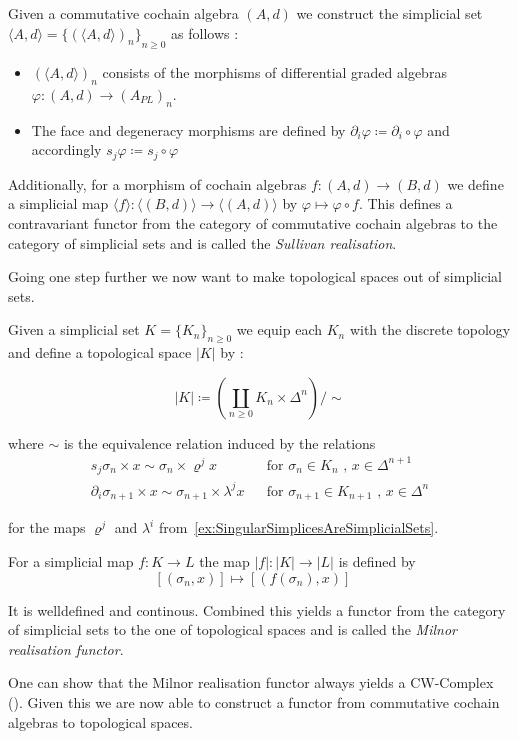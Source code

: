  \begin{Definition}
  Given a commutative cochain algebra $(A,d)$ we construct the simplicial set 
  $\langle A , d \rangle = {\lbrace (\langle A , d \rangle)_n \rbrace}_{n \geq 0}$ as follows : \\
  \begin{itemize}
   \item $(\langle A,d \rangle)_n$ consists of the morphisms of differential graded algebras 
   $\varphi \colon (A,d) \to (A_{PL})_n$.
  \item The face and degeneracy morphisms are defined by $\partial_i \varphi \coloneqq \partial_i \circ \varphi$ and
  accordingly ${s_j \varphi \coloneqq s_j \circ \varphi}$ 
  \end{itemize}

  Additionally, for a morphism of cochain algebras ${f \colon (A,d) \to (B,d)}$ we define a simplicial map
  ${\langle f \rangle \colon \langle (B,d) \rangle \to \langle (A,d) \rangle}$ by
  ${\varphi \mapsto \varphi \circ f}$. \newline
  This defines a contravariant functor from the category of commutative cochain algebras to the category of simplicial sets
  and is called the \emph{Sullivan realisation}.
 \end{Definition}

 Going one step further we now want to make topological spaces out of simplicial sets.
 
 \begin{Definition}
  Given a simplicial set $K = {\lbrace K_n \rbrace}_{n \geq 0}$ we equip each $K_n$ 
  with the discrete topology and define a topological space $|K|$ by :
  
  $$|K| \coloneqq (\coprod_{n \geq 0} K_n \times \Delta^n) / \sim$$
  
  where $\sim$ is the equivalence relation induced by the relations
  \begin{align*}
   s_j \sigma_n \times x \sim \sigma_n \times \varrho^j x & & \text{for $\sigma_n \in K_n$ , $x \in \Delta^{n+1}$} \\
   \partial_i \sigma_{n+1} \times x \sim \sigma_{n+1} \times \lambda^j x & & \text{for $\sigma_{n+1} \in K_{n+1}$ , $x \in \Delta^n$}
  \end{align*}

   
  for the maps $\varrho^j$ and $\lambda^i$ from~\ref{ex:SingularSimplicesAreSimplicialSets}.
  
  For a simplicial map $f \colon K \to L$ the map $|f| \colon |K| \to |L|$ is defined by
  $$ [(\sigma_n , x)] \mapsto [(f(\sigma_n) , x)] \quad $$
  
  It is welldefined and continous.
  Combined this yields a functor from the category of simplicial sets to the one of topological spaces and
  is called the \emph{Milnor realisation functor}.
 \end{Definition}
 One can show that the Milnor realisation functor always yields a CW-Complex (\cite{Milnor1957}).
 Given this we are now able to construct a functor from commutative cochain algebras to topological spaces.
 
